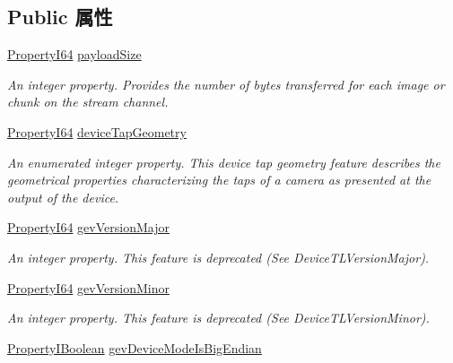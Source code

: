 \subsection*{Public 属性}
\begin{DoxyCompactItemize}
\item 
\hyperlink{group___common_interface_ga81749b2696755513663492664a18a893}{Property\+I64} \hyperlink{classmv_i_m_p_a_c_t_1_1acquire_1_1_gen_i_cam_1_1_transport_layer_control_a60fb7c69b1fa34dabb0e1159759fca4a}{payload\+Size}
\begin{DoxyCompactList}\small\item\em An integer property. Provides the number of bytes transferred for each image or chunk on the stream channel. \end{DoxyCompactList}\item 
\hyperlink{group___common_interface_ga81749b2696755513663492664a18a893}{Property\+I64} \hyperlink{classmv_i_m_p_a_c_t_1_1acquire_1_1_gen_i_cam_1_1_transport_layer_control_ac0d7a3f13520344eb6df37e15e050cac}{device\+Tap\+Geometry}
\begin{DoxyCompactList}\small\item\em An enumerated integer property. This device tap geometry feature describes the geometrical properties characterizing the taps of a camera as presented at the output of the device. \end{DoxyCompactList}\item 
\hyperlink{group___common_interface_ga81749b2696755513663492664a18a893}{Property\+I64} \hyperlink{classmv_i_m_p_a_c_t_1_1acquire_1_1_gen_i_cam_1_1_transport_layer_control_ad050c03e7fa774908de735b1f0babd6a}{gev\+Version\+Major}
\begin{DoxyCompactList}\small\item\em An integer property. This feature is deprecated (See Device\+T\+L\+Version\+Major). \end{DoxyCompactList}\item 
\hyperlink{group___common_interface_ga81749b2696755513663492664a18a893}{Property\+I64} \hyperlink{classmv_i_m_p_a_c_t_1_1acquire_1_1_gen_i_cam_1_1_transport_layer_control_a14681ac25aa9a0c4b6e1863645d4e156}{gev\+Version\+Minor}
\begin{DoxyCompactList}\small\item\em An integer property. This feature is deprecated (See Device\+T\+L\+Version\+Minor). \end{DoxyCompactList}\item 
\hyperlink{group___common_interface_ga44f9437e24b21b6c93da9039ec6786aa}{Property\+I\+Boolean} \hyperlink{classmv_i_m_p_a_c_t_1_1acquire_1_1_gen_i_cam_1_1_transport_layer_control_a50239d950e31b55c2b789ed5069963b4}{gev\+Device\+Mode\+Is\+Big\+Endian}

\end{DoxyCompactItemize}
